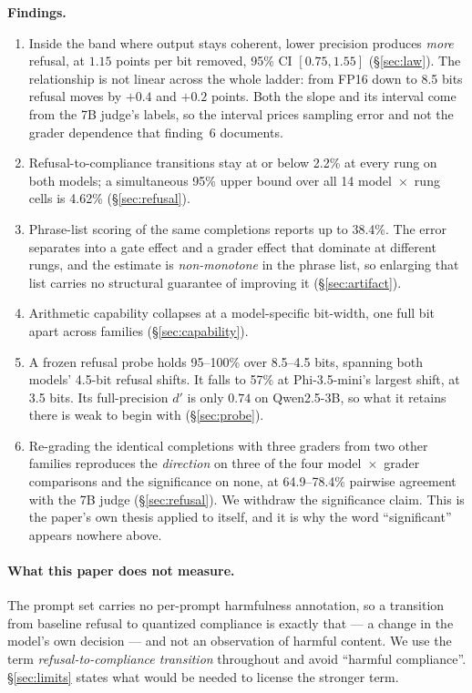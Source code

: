 \documentclass[11pt,a4paper]{article}
\begin{document}
\begin{keybox}
\textbf{Findings.}
\begin{enumerate}[leftmargin=1.4em]
  \item Inside the band where output stays coherent, lower precision produces
        \emph{more} refusal, at $1.15$ points per bit removed, 95\% CI
        $[0.75, 1.55]$ (\S\ref{sec:law}). The relationship is not linear across
        the whole ladder: from FP16 down to 8.5 bits refusal moves by $+0.4$ and
        $+0.2$ points. Both the slope and its interval come from the 7B judge's
        labels, so the interval prices sampling error and not the grader
        dependence that finding~6 documents.
  \item Refusal-to-compliance transitions stay at or below 2.2\% at every rung
        on both models; a simultaneous 95\% upper bound over all 14
        model~$\times$~rung cells is 4.62\% (\S\ref{sec:refusal}).
  \item Phrase-list scoring of the same completions reports up to 38.4\%. The
        error separates into a gate effect and a grader effect that dominate at
        different rungs, and the estimate is \emph{non-monotone} in the phrase
        list, so enlarging that list carries no structural guarantee of
        improving it (\S\ref{sec:artifact}).
  \item Arithmetic capability collapses at a model-specific bit-width, one full
        bit apart across families (\S\ref{sec:capability}).
  \item A frozen refusal probe holds 95--100\% over 8.5--4.5 bits, spanning both
        models' 4.5-bit refusal shifts. It falls to 57\% at Phi-3.5-mini's
        largest shift, at 3.5 bits. Its full-precision $d'$ is only
        $0.74$ on Qwen2.5-3B, so what it retains there is weak to begin with
        (\S\ref{sec:probe}).
  \item Re-grading the identical completions with three graders from two other
        families reproduces the \emph{direction} on three of the four
        model~$\times$~grader comparisons and the significance on none, at
        64.9--78.4\% pairwise agreement with the 7B
        judge (\S\ref{sec:refusal}). We withdraw the significance claim. This is
        the paper's own thesis applied to itself, and it is why the word
        ``significant'' appears nowhere above.
\end{enumerate}
\end{keybox}

\paragraph{What this paper does not measure.} The prompt set carries no
per-prompt harmfulness annotation, so a transition from baseline refusal to
quantized compliance is exactly that --- a change in the model's own decision ---
and not an observation of harmful content. We use the term
\emph{refusal-to-compliance transition} throughout and avoid ``harmful
compliance''. \S\ref{sec:limits} states what would be needed to license the
stronger term.
\end{document}
